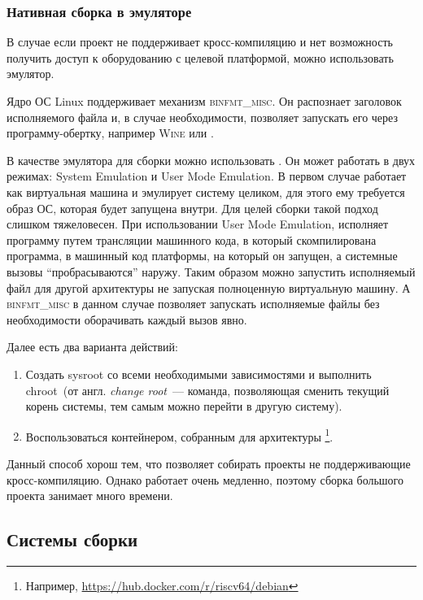 \subsubsection{Нативная сборка в эмуляторе}

В случае если проект не поддерживает кросс-компиляцию и нет возможность получить доступ к оборудованию с целевой платформой, можно использовать эмулятор.

Ядро ОС Linux поддерживает механизм \textsc{binfmt\_misc}.
Он распознает заголовок исполняемого файла и, в случае необходимости, позволяет запускать его через программу-обертку, например \textsc{Wine} или \qemu{}.

В качестве эмулятора для сборки можно использовать \qemu{}.
Он может работать в двух режимах: System Emulation и User Mode Emulation.
В первом случае \qemu{} работает как виртуальная машина и эмулирует систему целиком, для этого ему требуется образ ОС, которая будет запущена внутри.
Для целей сборки такой подход слишком тяжеловесен.
При использовании User Mode Emulation, \qemu{} исполняет программу путем трансляции машинного кода, в который скомпилирована программа, в машинный код платформы, на который он запущен, а системные вызовы \enquote{пробрасываются} наружу.
Таким образом можно запустить исполняемый файл для другой архитектуры не запуская полноценную виртуальную машину.
А \textsc{binfmt\_misc} в данном случае позволяет запускать исполняемые файлы без необходимости оборачивать каждый вызов явно.

Далее есть два варианта действий:
\begin{enumerate}
	\item Создать sysroot со всеми необходимыми зависимостями и выполнить chroot~(от англ. \textit{change root}~--- команда, позволяющая сменить текущий корень системы, тем самым можно перейти в другую систему).
	\item Воспользоваться \docker{} контейнером, собранным для архитектуры \riscv{}\footnote{Например, \url{https://hub.docker.com/r/riscv64/debian}}.
\end{enumerate}

Данный способ хорош тем, что позволяет собирать проекты не поддерживающие кросс-компиляцию.
Однако \qemu{} работает очень медленно, поэтому сборка большого проекта занимает много времени.

\subsection{Системы сборки}
\label{subsec:build_systems}

